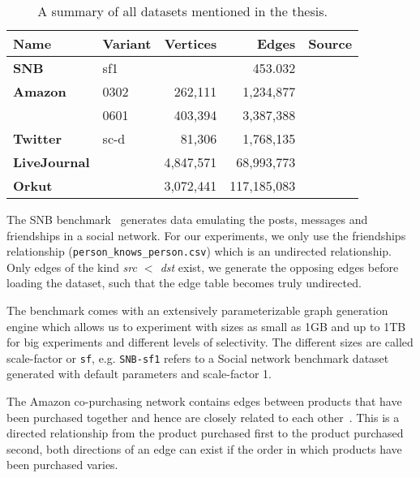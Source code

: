 \begin{table}[]
    \centering
    \begin{tabular}{llrrl} \toprule
        Name    & Variant              &  Vertices   & Edges          & Source          \\ \midrule
        \textbf{SNB}         & sf1     &             &  453.032       & \cite{snb}      \\
        \textbf{Amazon}      & 0302    & 262,111     &  1,234,877     & \cite{snapnets} \\
                             & 0601    & 403,394     &  3,387,388     & \cite{snapnets} \\
        \textbf{Twitter}     & sc-d    & 81,306      &  1,768,135     & \cite{snapnets} \\
        \textbf{LiveJournal} &         & 4,847,571   & 68,993,773     & \cite{snapnets} \\
        \textbf{Orkut}       &         & 3,072,441   & 117,185,083    & \cite{snapnets} \\ \bottomrule
    \end{tabular}
    \caption{A summary of all datasets mentioned in the thesis.}
    \label{table:datasets}
\end{table}

The SNB benchmark~\cite{snb} generates data emulating the posts, messages and friendships in a social network.
For our experiments, we only use the friendships relationship (\texttt{person\_knows\_person.csv}) which is an undirected relationship.
Only edges of the kind \textit{src $<$ dst} exist, we generate the opposing edges before loading the dataset, such
that the edge table becomes truly undirected.

The benchmark comes with an extensively parameterizable graph generation engine
which allows us to experiment with sizes as small as 1GB and up to 1TB for big experiments and different levels of selectivity.
The different sizes are called scale-factor or \texttt{sf}, e.g. \texttt{SNB-sf1} refers to a Social network benchmark dataset generated with
default parameters and scale-factor 1.

The Amazon co-purchasing network contains edges between products that have been purchased together and hence are closely related to each other~\cite{snapnets}.
This is a directed relationship from the product purchased first to the product purchased second, both directions of an edge can exist if the order in which
products have been purchased varies.

